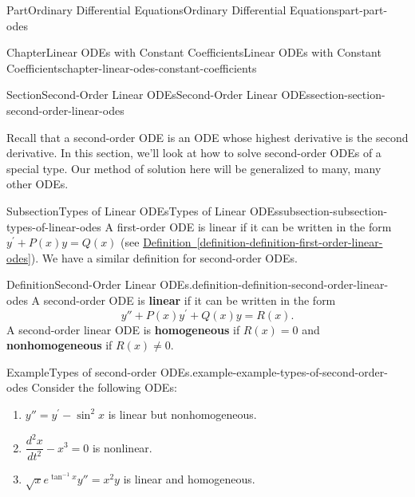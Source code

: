\documentclass[twoside,10pt,]{book}
\newcommand{\xreffont}{\relax}
\newcommand{\terminology}[1]{\textbf{#1}}
\numberwithin{equation}{part}
\newcommand{\dv}[3][]{\dfrac{d^{#1} #2}{d #3^{#1}}}
\begin{document}
\begin{partptx}{Part}{Ordinary Differential Equations}{}{Ordinary Differential Equations}{}{}{part-part-odes}
\begin{chapterptx}{Chapter}{Linear ODEs with Constant Coefficients}{}{Linear ODEs with Constant Coefficients}{}{}{chapter-linear-odes-constant-coefficients}
\begin{introduction}{}
\end{introduction}%
%
%
\typeout{************************************************}
\typeout{************************************************}
%
\begin{sectionptx}{Section}{Second-Order Linear ODEs}{}{Second-Order Linear ODEs}{}{}{section-section-second-order-linear-odes}
\begin{introduction}{}%
Recall that a second-order ODE is an ODE whose highest derivative is the second derivative. In this section, we'll look at how to solve second-order ODEs of a special type. Our method of solution here will be generalized to many, many other ODEs.%
\end{introduction}%
%
%
\typeout{************************************************}
\typeout{************************************************}
%
\begin{subsectionptx}{Subsection}{Types of Linear ODEs}{}{Types of Linear ODEs}{}{}{subsection-subsection-types-of-linear-odes}
A first-order ODE is linear if it can be written in the form \(y^\prime+P(x)y = Q(x)\) (see \hyperref[definition-definition-first-order-linear-odes]{Definition~{\xreffont\ref{definition-definition-first-order-linear-odes}}}). We have a similar definition for second-order ODEs.%
\begin{definition}{Definition}{Second-Order Linear ODEs.}{definition-definition-second-order-linear-odes}%
%
A second-order ODE is \terminology{linear} if it can be written in the form%
\begin{equation*}
y''+P(x)y^\prime+Q(x)y = R(x).
\end{equation*}
A second-order linear ODE is \terminology{homogeneous} if \(R(x) = 0\) and \terminology{nonhomogeneous} if \(R(x)\neq0\).%
\end{definition}
\begin{example}{Example}{Types of second-order ODEs.}{example-example-types-of-second-order-odes}%
Consider the following ODEs:%
\begin{enumerate}
\item{}\(y'' = y^\prime - \sin^{2}x\) is linear but nonhomogeneous.%
\item{}\(\dv[2]{x}{t} - x^{3} = 0\) is nonlinear.%
\item{}\(\sqrt{x}e^{\tan^{-1}x}y'' = x^{2}y\) is linear and homogeneous.%
\end{enumerate}

\end{example}
\end{subsectionptx}
\end{sectionptx}
\end{chapterptx}
\end{partptx}
\end{document}
